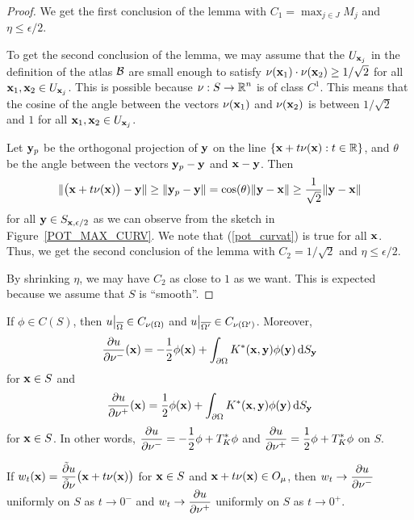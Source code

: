 \begin{proof}
We get the first conclusion of the lemma with
$\displaystyle C_1 = \max_{j \in J} M_j$ and $\eta \leq \epsilon /2$.

To get the second conclusion of the lemma, we may assume that the
$U_{\mathbf{x}_j}$ in the definition of the atlas $\mathcal{B}$ are small enough
to satisfy 
$\mathbf{\nu}(\mathbf{x}_1)\cdot \mathbf{\nu}(\mathbf{x}_2) \geq 1/\sqrt{2}$ for all
$\mathbf{x}_1,\mathbf{x}_2 \in U_{\mathbf{x}_j}$.  This is possible because
$\displaystyle \mathbf{\nu}:S \to \mathbb{R}^n$ is of class $C^1$.  This means that
the cosine of the angle between the vectors
$\mathbf{\nu}(\mathbf{x}_1)$ and $\mathbf{\nu}(\mathbf{x}_2)$ is between $1/\sqrt{2}$ and
$1$ for all $\mathbf{x}_1,\mathbf{x}_2 \in U_{\mathbf{x}_j}$.

Let $\mathbf{y}_p$ be the orthogonal projection of $\mathbf{y}$ on the line
$\displaystyle \left\{\mathbf{x} + t\mathbf{\nu}(\mathbf{x}) : t \in \mathbb{R} \right\}$,
and $\theta$ be the angle between the vectors $\mathbf{y}_p - \mathbf{y}$ and
$\mathbf{x}- \mathbf{y}$.  Then
\begin{equation} \label{pot_curvat}
\| \big(\mathbf{x} + t\mathbf{\nu}(\mathbf{x})\big)-\mathbf{y} \|
\geq \|\mathbf{y}_p - \mathbf{y}\| = \cos(\theta)
\|\mathbf{y}-\mathbf{x}\| \geq \frac{1}{\sqrt{2}} \|\mathbf{y}-\mathbf{x}\|
\end{equation}
for all $\mathbf{y} \in S_{\mathbf{x},\epsilon/2}$ as we can observe from
the sketch in Figure~\ref{POT_MAX_CURV}.    We note that
(\ref{pot_curvat}) is true for all $\mathbf{x}$.  Thus, we get the second
conclusion of the lemma with $C_2 = 1/\sqrt{2}$ and $\eta \leq \epsilon/2$.

By shrinking $\eta$, we may have $C_2$ as close to $1$ as we want.
This is expected because we assume that $S$ is ``smooth''.
\end{proof}


\begin{theorem} \label{pot_slp_exist}
If $\phi \in C(S)$, then
$\displaystyle u\big|_{\overline{\Omega}} \in C_{\mathbf{\nu}(\Omega)}$ and
$\displaystyle u\big|_{\overline{\Omega^{\prime}}} \in
C_{\mathbf{\nu}(\Omega^{\prime})}$.
Moreover,
\[
\frac{\partial{u}}{\partial \mathbf{\nu}^-}(\mathbf{x}) = -\frac{1}{2} \phi(\mathbf{x}) +
\int_{\partial \Omega} K^\ast(\mathbf{x},\mathbf{y}) \phi(\mathbf{y}) \,\mathrm{d}{S}_{\mathbf{y}}
\]
for $\mathbf{x} \in S$ and
\[
\frac{\partial{u}}{\partial \mathbf{\nu}^+}(\mathbf{x}) = \frac{1}{2} \phi(\mathbf{x}) +
\int_{\partial \Omega} K^\ast(\mathbf{x},\mathbf{y}) \phi(\mathbf{y}) \,\mathrm{d}{S}_{\mathbf{y}}
\]
for $\mathbf{x} \in S$.  In other words,
$\displaystyle \frac{\partial{u}}{\partial \mathbf{\nu}^-} = -\frac{1}{2} \phi + T^\ast_K \phi$
and
$\displaystyle \frac{\partial{u}}{\partial \mathbf{\nu}^+} = \frac{1}{2} \phi + T^\ast_K \phi$
on $S$.

If $\displaystyle
w_t(\mathbf{x}) = \frac{\tilde{\partial}{u}}{\tilde{\partial}{\mathbf{\nu}}}\big(\mathbf{x}+t\mathbf{\nu}(\mathbf{x})\big)$
for $\mathbf{x} \in S$ and $\mathbf{x} + t \mathbf{\nu}(\mathbf{x}) \in O_\mu$,
then $\displaystyle w_t \rightarrow \frac{\partial{u}}{\partial \mathbf{\nu}^-}$ uniformly
on $S$ as $t\rightarrow 0^-$ and
$\displaystyle w_t \rightarrow \frac{\partial{u}}{\partial \mathbf{\nu}^+}$ uniformly on
$S$ as $t\rightarrow 0^+$.
\end{theorem}

